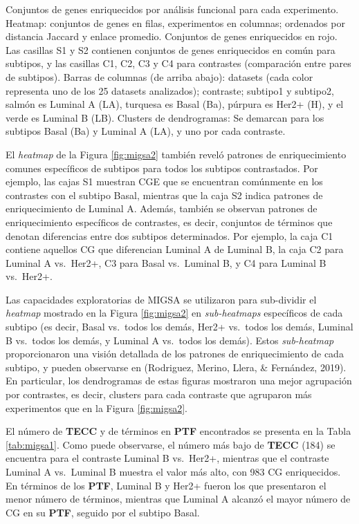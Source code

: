 \documentclass[12pt,twoside]{reedthesis}
\begin{document}
Conjuntos de genes enriquecidos por análisis funcional para cada experimento. Heatmap: conjuntos de genes en filas, experimentos en columnas; ordenados por distancia Jaccard y enlace promedio. Conjuntos de genes enriquecidos en rojo. Las casillas S1 y S2 contienen conjuntos de genes enriquecidos en común para subtipos, y las casillas C1, C2, C3 y C4 para contrastes (comparación entre pares de subtipos). Barras de columnas (de arriba abajo): datasets (cada color representa uno de los 25 datasets analizados); contraste; subtipo1 y subtipo2, salmón es Luminal A (LA), turquesa es Basal (Ba), púrpura es Her2+ (H), y el verde es Luminal B (LB). Clusters de dendrogramas: Se demarcan para los subtipos Basal (Ba) y Luminal A (LA), y uno por cada contraste.



\par

El \emph{heatmap} de la Figura \ref{fig:migsa2} también reveló patrones de enriquecimiento comunes específicos de subtipos para todos los subtipos contrastados. Por ejemplo, las cajas S1 muestran CGE que se encuentran comúnmente en los contrastes con el subtipo Basal, mientras que la caja S2 indica patrones de enriquecimiento de Luminal A. Además, también se observan patrones de enriquecimiento específicos de contrastes, es decir, conjuntos de términos que denotan diferencias entre dos subtipos determinados. Por ejemplo, la caja C1 contiene aquellos CG que diferencian Luminal A de Luminal B, la caja C2 para Luminal A vs.~Her2+, C3 para Basal vs.~Luminal B, y C4 para Luminal B vs.~Her2+.

\par

Las capacidades exploratorias de MIGSA se utilizaron para sub-dividir el \emph{heatmap} mostrado en la Figura \ref{fig:migsa2} en \emph{sub-heatmaps} específicos de cada subtipo (es decir, Basal vs.~todos los demás, Her2+ vs.~todos los demás, Luminal B vs.~todos los demás, y Luminal A vs.~todos los demás). Estos \emph{sub-heatmap} proporcionaron una visión detallada de los patrones de enriquecimiento de cada subtipo, y pueden observarse en (Rodriguez, Merino, Llera, \& Fernández, 2019). En particular, los dendrogramas de estas figuras mostraron una mejor agrupación por contrastes, es decir, clusters para cada contraste que agruparon más experimentos que en la Figura \ref{fig:migsa2}.

\par

El número de \textbf{TECC} y de términos en \textbf{PTF} encontrados se presenta en la Tabla \ref{tab:migsa1}. Como puede observarse, el número más bajo de \textbf{TECC} (184) se encuentra para el contraste Luminal B vs.~Her2+, mientras que el contraste Luminal A vs.~Luminal B muestra el valor más alto, con 983 CG enriquecidos. En términos de los \textbf{PTF}, Luminal B y Her2+ fueron los que presentaron el menor número de términos, mientras que Luminal A alcanzó el mayor número de CG en su \textbf{PTF}, seguido por el subtipo Basal.
\end{document}
